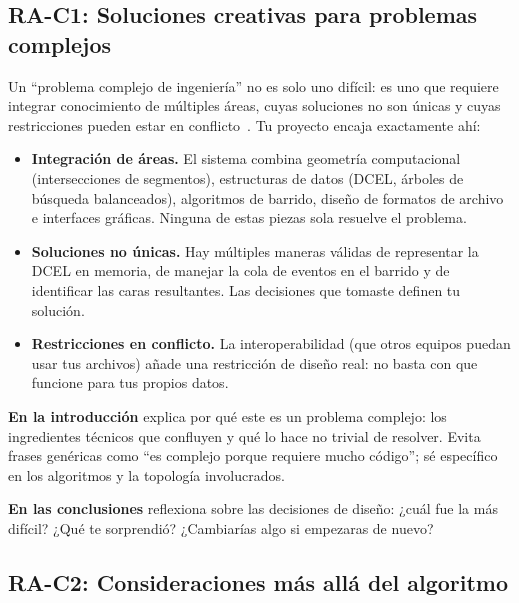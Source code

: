 \documentclass[12pt, oneside]{article}
\begin{document}
\subsection{RA-C1: Soluciones creativas para problemas complejos}

Un ``problema complejo de ingeniería'' no es solo uno difícil: es uno
que requiere integrar conocimiento de múltiples áreas, cuyas soluciones
no son únicas y cuyas restricciones pueden estar en
conflicto~\cite{ABET2023}.  Tu proyecto encaja exactamente ahí:

\begin{itemize}
  \item \textbf{Integración de áreas.}  El sistema combina geometría
        computacional (intersecciones de segmentos), estructuras de
        datos (DCEL, árboles de búsqueda balanceados), algoritmos de
        barrido, diseño de formatos de archivo e interfaces gráficas.
        Ninguna de estas piezas sola resuelve el problema.

  \item \textbf{Soluciones no únicas.}  Hay múltiples maneras válidas
        de representar la DCEL en memoria, de manejar la cola de
        eventos en el barrido y de identificar las caras resultantes.
        Las decisiones que tomaste definen tu solución.

  \item \textbf{Restricciones en conflicto.}  La interoperabilidad
        (que otros equipos puedan usar tus archivos) añade una
        restricción de diseño real: no basta con que funcione para
        tus propios datos.
\end{itemize}

\textbf{En la introducción} explica por qué este es un problema complejo:
los ingredientes técnicos que confluyen y qué lo hace no trivial de
resolver.  Evita frases genéricas como ``es complejo porque requiere
mucho código''; sé específico en los algoritmos y la topología
involucrados.

\textbf{En las conclusiones} reflexiona sobre las decisiones de diseño:
¿cuál fue la más difícil?  ¿Qué te sorprendió?  ¿Cambiarías algo si
empezaras de nuevo?

\subsection{RA-C2: Consideraciones más allá del algoritmo}
\end{document}
